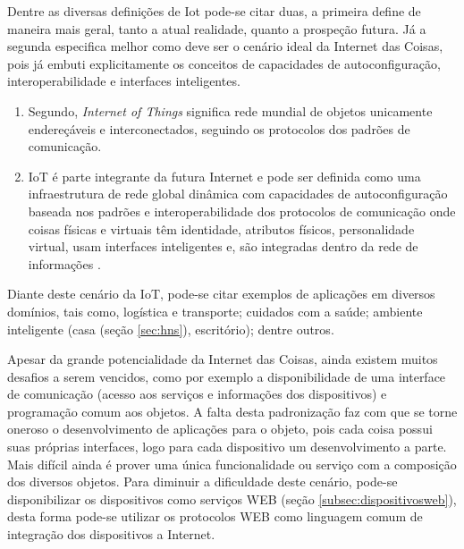 Dentre as diversas definições de Iot pode-se citar duas, a primeira define de maneira mais geral, tanto a atual realidade, quanto a prospeção futura. Já a segunda especifica melhor como deve ser o cenário ideal da Internet das Coisas, pois já embuti explicitamente os conceitos de capacidades de autoconfiguração, interoperabilidade e interfaces inteligentes.
\begin{enumerate}
\item Segundo\cite{iot2020:2008}, \textit{Internet of Things} significa rede mundial de objetos unicamente endereçáveis e interconectados, seguindo os protocolos dos padrões de comunicação.
\item IoT é parte integrante da futura Internet e pode ser definida como uma infraestrutura de rede global dinâmica com capacidades de autoconfiguração baseada nos padrões e interoperabilidade dos protocolos de comunicação onde coisas físicas e virtuais têm identidade, atributos físicos, personalidade virtual, usam interfaces inteligentes e, são integradas dentro da rede de informações \cite{Sundmaeker:2010}.
\end{enumerate}

Diante deste cenário da IoT, pode-se citar exemplos de aplicações em diversos domínios, tais como, logística e transporte; cuidados com a saúde; ambiente inteligente (casa (seção \ref{sec:hns}), escritório); dentre outros\cite{Atzori:2010}.

Apesar da grande potencialidade da Internet das Coisas, ainda existem muitos desafios a serem vencidos, como por exemplo a disponibilidade de uma interface de comunicação (acesso aos serviços e informações dos dispositivos) e programação comum aos objetos. A falta desta padronização faz com que se torne oneroso o desenvolvimento de aplicações para o objeto, pois cada coisa possui suas próprias interfaces, logo para cada dispositivo um desenvolvimento a parte. Mais difícil ainda é prover uma única funcionalidade ou serviço com a composição dos diversos objetos. Para diminuir a dificuldade deste cenário, pode-se disponibilizar os dispositivos como serviços WEB (seção \ref{subsec:dispositivosweb}), desta forma pode-se utilizar os protocolos WEB como linguagem comum de integração dos dispositivos a Internet.\cite{Franca:2011}


